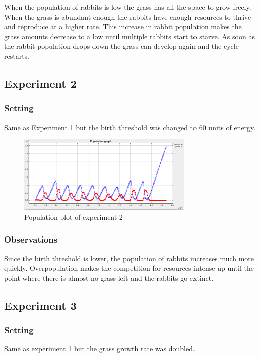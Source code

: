 \documentclass[11pt]{article}
\begin{document}
When the population of rabbits is low the grass has all the space to grow
freely. When the grass is abundant enough the rabbits have enough resources to
thrive and reproduce at a higher rate. This increase in rabbit population makes
the grass amounts decrease to a low until multiple rabbits start to starve. As
soon as the rabbit population drops down the grass can develop again and the
cycle restarts.

\subsection{Experiment 2}

\subsubsection{Setting}
Same as Experiment 1 but the birth threshold was changed to 60 units of energy.

\begin{figure}[h]
  \caption{Population plot of experiment 2}
  \includegraphics[width=0.75\textwidth]{experiment2}
  \centering
\end{figure}

\subsubsection{Observations}
Since the birth threshold is lower, the population of rabbits increases much
more quickly. Overpopulation makes the competition for resources intense up
until the point where there is almost no grass left and the rabbits go extinct.

\subsection{Experiment 3}

\subsubsection{Setting}
Same as experiment 1 but the grass growth rate was doubled.
\end{document}
